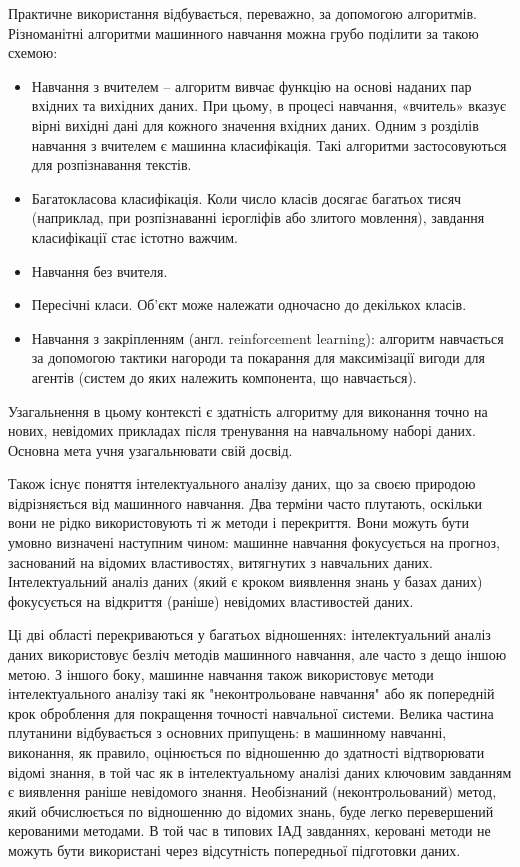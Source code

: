 Практичне використання відбувається, переважно, за допомогою алгоритмів. Різноманітні алгоритми машинного навчання можна грубо поділити за такою схемою:
\begin{itemize}  
	\item Навчання з вчителем – алгоритм вивчає функцію на основі наданих пар вхідних та вихідних даних. При цьому, в процесі навчання, «вчитель» вказує вірні вихідні дані для кожного значення вхідних даних. Одним з розділів навчання з вчителем є машинна класифікація. Такі алгоритми застосовуються для розпізнавання текстів.
	\item Багатокласова класифікація. Коли число класів досягає багатьох тисяч (наприклад, при розпізнаванні ієрогліфів або злитого мовлення), завдання класифікації стає істотно важчим.
	\item Навчання без вчителя.
	\item Пересічні класи. Об'єкт може належати одночасно до декількох класів.
	\item Навчання з закріпленням (англ. reinforcement learning): алгоритм навчається за допомогою тактики нагороди та покарання для максимізації вигоди для агентів (систем до яких належить компонента, що навчається).
\end{itemize}

Узагальнення в цьому контексті є здатність алгоритму для виконання точно на нових, невідомих прикладах після тренування на навчальному наборі даних. Основна мета учня узагальнювати свій досвід.

Також існує поняття інтелектуального аналізу даних, що за своєю природою відрізняється від машинного навчання. Два терміни часто плутають, оскільки вони не рідко використовують ті ж методи і перекриття. Вони можуть бути умовно визначені наступним чином: машинне навчання фокусується на прогноз, заснований на відомих властивостях, витягнутих з навчальних даних. Інтелектуальний аналіз даних (який є кроком виявлення знань у базах даних) фокусується на відкриття (раніше) невідомих властивостей даних.

Ці дві області перекриваються у багатьох відношеннях: інтелектуальний аналіз даних використовує безліч методів машинного навчання, але часто з дещо іншою метою. З іншого боку, машинне навчання також використовує методи інтелектуального аналізу такі як "неконтрольоване навчання" або як попередній крок оброблення для покращення точності навчальної системи. Велика частина плутанини відбувається з основних припущень: в машинному навчанні, виконання, як правило, оцінюється по відношенню до здатності відтворювати відомі знання, в той час як в інтелектуальному аналізі даних ключовим завданням є виявлення раніше невідомого знання. Необізнаний (неконтрольований) метод, який обчислюється по відношенню до відомих знань, буде легко перевершений керованими методами. В той час в типових ІАД завданнях, керовані методи не можуть бути використані через відсутність попередньої підготовки даних.

